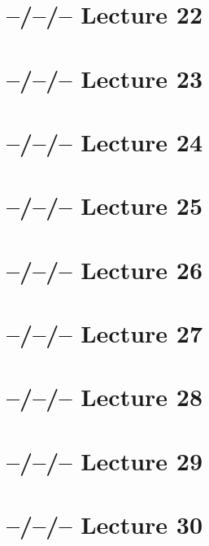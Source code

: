 \documentclass{article}
\theoremstyle{definition}
\begin{document}
\section{--/--/-- Lecture 22}

\section{--/--/-- Lecture 23}

\section{--/--/-- Lecture 24}

\section{--/--/-- Lecture 25}

\section{--/--/-- Lecture 26}

\section{--/--/-- Lecture 27}

\section{--/--/-- Lecture 28}

\section{--/--/-- Lecture 29}

\section{--/--/-- Lecture 30}
\end{document}
